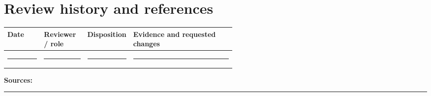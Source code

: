 \documentclass[11pt,letterpaper]{article}
\newcommand{\BlankResponse}{\rule[-0.4em]{0pt}{2em}\rule{0.65\linewidth}{0.4pt}}
\begin{document}
\section{Review history and references}
\begin{tabularx}{\linewidth}{@{}p{0.16\linewidth}p{0.19\linewidth}p{0.19\linewidth}X@{}}
\toprule
\textbf{Date} & \textbf{Reviewer / role} & \textbf{Disposition} & \textbf{Evidence and requested changes}\\
\midrule
\BlankResponse & \BlankResponse & \BlankResponse & \BlankResponse\\
\bottomrule
\end{tabularx}\par

\noindent\textbf{Sources:} \BlankResponse
\end{document}
